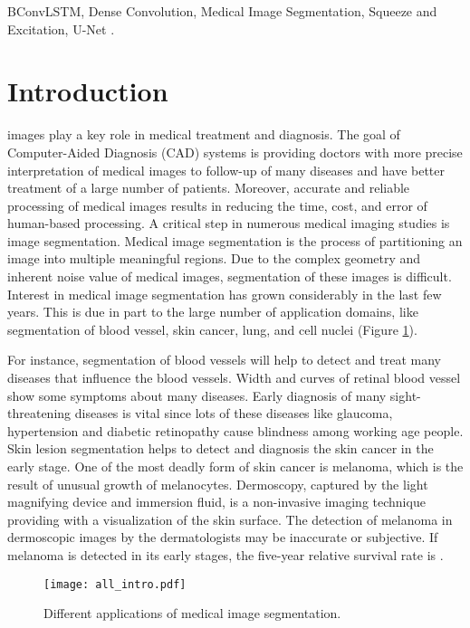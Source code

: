 \documentclass[journal]{IEEEtran}
\begin{document}
\begin{IEEEkeywords}
BConvLSTM, Dense Convolution, Medical Image Segmentation, Squeeze and Excitation, U-Net .
\end{IEEEkeywords}

\section{Introduction}
\label{sec:introduction}


 images play a key role in medical treatment and diagnosis. 
The goal of Computer-Aided Diagnosis (CAD) systems is providing doctors with more precise interpretation of medical images to follow-up of many diseases and have better treatment of a large number of patients. Moreover, accurate and reliable processing of medical images results in reducing the time, cost, and error of human-based processing. A critical step in numerous medical imaging studies is image segmentation. Medical image segmentation is the process of partitioning an image into multiple meaningful regions. Due to the complex geometry and inherent noise value of medical images, segmentation of these images is difficult. 
Interest in medical image segmentation has grown considerably in the last few years. This is due in part to the large number of application domains, like segmentation of blood vessel, skin cancer, lung, and cell nuclei (Figure \ref{fig:app}). 

For instance, segmentation of blood vessels will help to detect and treat many diseases that influence the blood vessels. Width and curves of retinal blood vessel show some symptoms about many diseases. Early diagnosis of many sight-threatening diseases is vital since lots of these diseases like glaucoma, hypertension and diabetic retinopathy cause blindness among working age people. 
Skin lesion segmentation helps to detect and diagnosis the skin cancer in the early stage. One of the most deadly form of skin cancer is melanoma, which is the result of unusual growth of melanocytes. Dermoscopy, captured by the light magnifying device and immersion fluid, is a non-invasive imaging technique providing with a visualization of the skin surface. The detection of melanoma in dermoscopic images by the dermatologists may be inaccurate or subjective. If melanoma is detected in its early stages, the five-year relative survival rate is  \cite{siegel2018jemal}. 




\begin{figure}
\centering
\texttt{[image: all\_intro.pdf]}
\caption{Different applications of medical image segmentation.} \label{fig:app}
\vspace*{-\baselineskip}
\end{figure}
\end{document}
